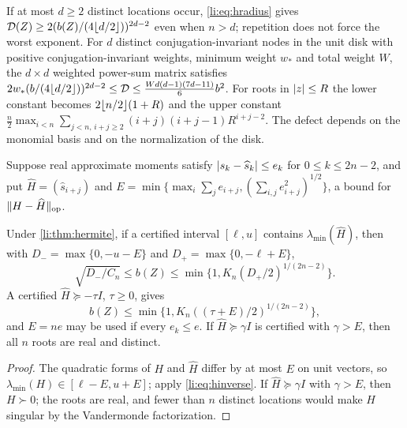 \begin{remark}\label{li:rem:distinct}
If at most $d\ge2$ distinct locations occur, \eqref{li:eq:hradius} gives
$\mathcal{D}(Z)\ge2(b(Z)/(4\lfloor d/2\rfloor))^{2d-2}$ even when $n>d$; repetition does not force the worst
exponent. For $d$ distinct conjugation-invariant nodes in the unit disk with positive
conjugation-invariant weights, minimum weight $w_*$ and total weight $W$, the $d\times d$ weighted
power-sum matrix satisfies $2w_*(b/(4\lfloor d/2\rfloor))^{2d-2}\le\mathcal{D}\le\frac{Wd(d-1)(7d-11)}6b^2$. For
roots in $\lvert z\rvert\le R$ the lower constant becomes $2\lfloor n/2\rfloor(1+R)$ and the upper constant
$\frac n2\max_{i<n}\sum_{j<n,\,i+j\ge2}(i+j)(i+j-1)R^{i+j-2}$. The defect depends on the monomial basis
and on the normalization of the disk.
\end{remark}

Suppose real approximate moments satisfy $\lvert s_k-\widehat s_k\rvert\le e_k$ for $0\le k\le2n-2$, and put
$\widehat H=(\widehat s_{i+j})$ and
$E=\min\{\max_i\sum_je_{i+j},(\sum_{i,j}e_{i+j}^2)^{1/2}\}$, a bound for
$\lVert H-\widehat H\rVert_{\mathrm{op}}$.

\begin{corollary}\label{li:cor:hnoise}
Under \cref{li:thm:hermite}, if a certified interval $[\ell,u]$ contains $\lambda_{\min}(\widehat H)$,
then with $D_-=\max\{0,-u-E\}$ and $D_+=\max\{0,-\ell+E\}$,
\begin{equation}\label{li:eq:hcertified}
 \sqrt{D_-/C_n}\le b(Z)\le\min\{1,K_n(D_+/2)^{1/(2n-2)}\}.
\end{equation}
A certified $\widehat H\succeq-\tau I$, $\tau\ge0$, gives
\begin{equation}\label{li:eq:hslack}
 b(Z)\le\min\{1,K_n((\tau+E)/2)^{1/(2n-2)}\},
\end{equation}
and $E=ne$ may be used if every $e_k\le e$. If $\widehat H\succeq\gamma I$ is certified with
$\gamma>E$, then all $n$ roots are real and distinct.
\end{corollary}

\begin{proof}
The quadratic forms of $H$ and $\widehat H$ differ by at most $E$ on unit vectors, so
$\lambda_{\min}(H)\in[\ell-E,u+E]$; apply \eqref{li:eq:hinverse}. If $\widehat H\succeq\gamma I$ with
$\gamma>E$, then $H\succ0$; the roots are real, and fewer than $n$ distinct locations would make $H$
singular by the Vandermonde factorization.
\end{proof}

